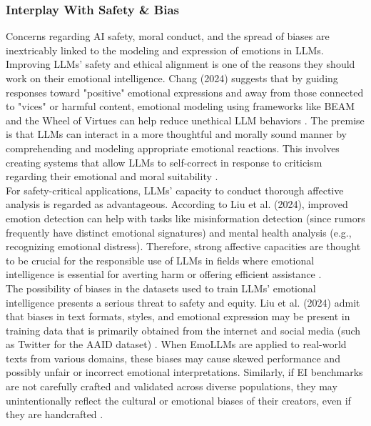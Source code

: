 \documentclass{DESSThesis}
\begin{document}
\subsubsection{Interplay With Safety \& Bias}
Concerns regarding AI safety, moral conduct, and the spread of biases are inextricably linked to the modeling and expression of emotions in LLMs.
\\
Improving LLMs' safety and ethical alignment is one of the reasons they should work on their emotional intelligence. Chang (2024) suggests that by guiding responses toward "positive" emotional expressions and away from those connected to "vices" or harmful content, emotional modeling using frameworks like BEAM and the Wheel of Virtues can help reduce unethical LLM behaviors . The premise is that LLMs can interact in a more thoughtful and morally sound manner by comprehending and modeling appropriate emotional reactions. This involves creating systems that allow LLMs to self-correct in response to criticism regarding their emotional and moral suitability \cite{chang_modeling_2024}.
\\
For safety-critical applications, LLMs' capacity to conduct thorough affective analysis is regarded as advantageous. According to Liu et al. (2024), improved emotion detection can help with tasks like misinformation detection (since rumors frequently have distinct emotional signatures) and mental health analysis (e.g., recognizing emotional distress). Therefore, strong affective capacities are thought to be crucial for the responsible use of LLMs in fields where emotional intelligence is essential for averting harm or offering efficient assistance \cite{liu_emollms_2024}.
\\
The possibility of biases in the datasets used to train LLMs' emotional intelligence presents a serious threat to safety and equity. Liu et al. (2024) admit that biases in text formats, styles, and emotional expression may be present in training data that is primarily obtained from the internet and social media (such as Twitter for the AAID dataset) \cite{liu_emollms_2024}. When EmoLLMs are applied to real-world texts from various domains, these biases may cause skewed performance and possibly unfair or incorrect emotional interpretations. Similarly, if EI benchmarks are not carefully crafted and validated across diverse populations, they may unintentionally reflect the cultural or emotional biases of their creators, even if they are handcrafted \cite{sabour_emobench_2024,paech_eq-bench_2024}.
\\
\end{document}
